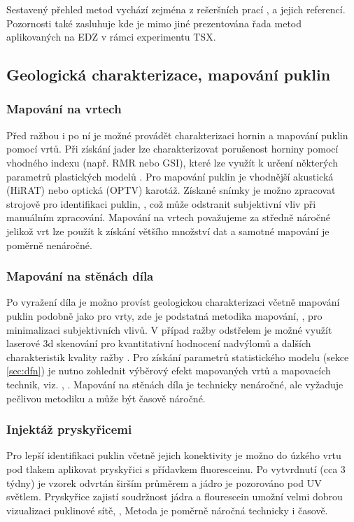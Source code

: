 \documentclass{article}
\begin{document}
Sestavený přehled metod vychází zejména z rešeršních prací \cite{Vavro2016}, \cite{Lanyon2011} a jejich referencí. 
Pozornosti také zasluhuje \cite{Chandler2002} kde je mimo jiné prezentována řada metod aplikovaných na EDZ v rámci experimentu TSX.



\subsection{Geologická charakterizace, mapování puklin}
\label{sec:mapovani_puklin}
\subsubsection{Mapování na vrtech}
Před ražbou i po ní je možné provádět charakterizaci hornin a mapování puklin pomocí vrtů. 
Při získání jader lze charakterizovat porušenost horniny pomocí vhodného indexu (např. RMR nebo GSI), 
které lze využít k určení některých parametrů plastických modelů \cite{Hoek2002}. 
Pro mapování puklin je vhodnější akustická (HiRAT) nebo optická (OPTV) karotáž. Získané snímky je možno 
zpracovat strojově pro identifikaci puklin, \cite{Tammisto2002}, což může odstranit subjektivní vliv při manuálním zpracování.
Mapování na vrtech považujeme za středně náročné jelikož vrt lze použít k získání většího množství dat 
a samotné mapování je poměrně nenáročné.

\subsubsection{Mapování na stěnách díla}
Po vyražení díla je možno províst geologickou charakterizaci včetně mapování puklin podobně jako pro vrty, 
zde je podstatná metodika mapování, \cite{Bossart2002},  pro minimalizaci subjektivních vlivů. 
V případ ražby odstřelem je možné využít laserové 3d skenování pro kvantitativní hodnocení 
nadvýlomů a dalších charakteristik kvality ražby \cite{Hudson2009a}. 
Pro získání parametrů statistického modelu (sekce \ref{sec:dfn}) je nutno zohlednit výběrový efekt 
mapovaných vrtů a mapovacích technik, viz. \cite{Zetterlund2012}, \cite{Torabi2011}. 
Mapování na stěnách díla je technicky nenáročné, ale vyžaduje pečlivou metodiku a může být časově náročné.

\subsubsection{Injektáž pryskyřicemi}
Pro lepší identifikaci puklin včetně jejich konektivity je možno do úzkého vrtu pod tlakem aplikovat 
pryskyřici s přídavkem fluoresceinu. Po vytvrdnutí (cca 3 týdny) je vzorek odvrtán širším průměrem a jádro je pozorováno pod UV světlem.
Pryskyřice zajistí soudržnost jádra a flourescein umožní velmi dobrou vizualizaci puklinové sítě, \cite{Bossart2002}, \cite{Lanyon2011}
Metoda je poměrně náročná technicky i časově.
\end{document}
